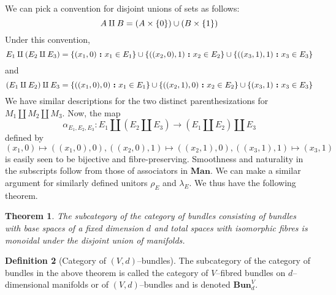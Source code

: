 \documentclass{amsart}
\renewcommand{\to}[1][]{\stackrel{#1}{\longrightarrow}}
\renewcommand{\mapsto}{\longmapsto}
\newcommand{\curly}[1]{\left\{ #1 \right\}}
\newcommand{\set}[2][]{\ifthenelse{\equal{#1}{}}
                                  {\curly{#2}}
                                  {\curly{#1\ \textbf{:}\ #2}}}
\newcommand{\Man}{\textbf{Man}}
\newcommand{\Bun}{\textbf{Bun}}
\newtheorem{thm}{Theorem}
\numberwithin{thm}{section}
\theoremstyle{definition}
\newtheorem{defn}[thm]{Definition}
\begin{document}
We can pick a convention for disjoint unions of sets as follows:
\[
  A \amalg B = (A \times \set{0}) \cup (B \times \set{1})
\]
Under this convention,
\[
  E_1 \amalg (E_2 \amalg E_3)
    = \set[(x_1, 0)]{x_1 \in E_1}
      \cup \set[((x_2, 0), 1)]{x_2 \in E_2}
      \cup \set[((x_3, 1), 1)]{x_3 \in E_3}
\]
and
\[
  (E_1 \amalg E_2) \amalg E_3
    = \set[((x_1, 0), 0)]{x_1 \in E_1}
      \cup \set[((x_2, 1), 0)]{x_2 \in E_2}
      \cup \set[(x_3, 1)]{x_3 \in E_3}
\]
We have similar descriptions for the two distinct parenthesizations for
$M_1 \amalg M_2 \amalg M_3$. Now, the map
\[
  \alpha_{E_1, E_2, E_3} : E_1 \amalg (E_2 \amalg E_3)
                           \to (E_1 \amalg E_2) \amalg E_3
\]
defined by
\[
  (x_1, 0) \mapsto ((x_1, 0), 0),
  ((x_2, 0), 1) \mapsto ((x_2, 1), 0),
  ((x_3, 1), 1) \mapsto (x_3, 1)
\]
is easily seen to be bijective and fibre-preserving. Smoothness and naturality
in the subscripts follow from those of associators in $\Man$. We can make a
similar argument for similarly defined unitors $\rho_E$ and $\lambda_E$. We thus
have the following theorem.
\begin{thm}
The subcategory of the category of bundles consisting of bundles with base
spaces of a fixed dimension $d$ and total spaces with isomorphic fibres is
monoidal under the disjoint union of manifolds.
\end{thm}
\begin{defn}[Category of {$(V, d)$--bundles}]
The subcategory of the category of bundles in the above theorem is called the
category of $V$--fibred bundles on $d$--dimensional manifolds or of
$(V, d)$--bundles and is denoted $\Bun^V_d$.
\end{defn}
\end{document}
